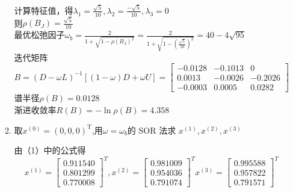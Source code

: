 \documentclass[a4paper]{article}
\begin{document}
\begin{enumerate}
\begin{enumerate}[label=(\arabic*)]
\begin{solution}
      计算特征值，得$\lambda_1=\frac{\sqrt{5}}{10},\lambda_2=\frac{-\sqrt{5}}{10},\lambda_3=0$\\
      则$\rho(B_J)=\frac{\sqrt{5}}{10}$\\
      最优松弛因子$\omega_{b}=\frac{2}{1+\sqrt{1-\rho(B_J)^2}}=\frac{2}{1+\sqrt{1-\left(\frac{\sqrt{5}}{10}\right)^2}}=40-4\sqrt{95}$\\
      迭代矩阵$B=\left(D-\omega L\right)^{-1}\left[(1-\omega)D+\omega U\right]=\begin{bmatrix} - 0.0128& - 0.1013&0 \\ 0.0013& - 0.0026& - 0.2026 \\  - 0.0003&0.0005&0.0282\end{bmatrix}$\\
      谱半径$\rho(B)=0.0128$\\
      渐进收敛率$R(B)=-\ln\rho(B)=4.358$
    \end{solution}
    \item 取$x^{(0)}=\left(0,0,0\right)^{\mathrm{T}}$,用$\omega=\omega_b$的 SOR 法求 $x^{(1)},x^{(2)},x^{(3)}$
    \begin{solution}
      由（1）中的公式得\\$$x^{(1)} = \begin{bmatrix}0.911540\\ 0.801299\\ 0.770008\end{bmatrix}^T, 
x^{(2)} = \begin{bmatrix}0.981009\\ 0.954036\\ 0.791074\end{bmatrix}^T
x^{(3)} = \begin{bmatrix}0.995588\\ 0.957822\\ 0.791571\end{bmatrix}^T$$
    \end{solution}
  \end{enumerate}


\end{enumerate}
\end{document}
